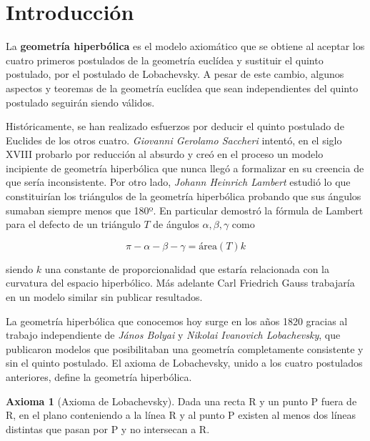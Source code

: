 \documentclass{article}
\theoremstyle{plain}
\theoremstyle{definition}
\newtheorem*{axiom}{Axioma}
\theoremstyle{remark}
\begin{document}
\maketitle

\newpage
\tableofcontents
\newpage

\section{Introducción}

La \textbf{geometría hiperbólica} es el modelo axiomático que se
obtiene al aceptar los cuatro primeros postulados de la geometría
euclídea y sustituir el quinto postulado, por el postulado de
Lobachevsky. A pesar de este cambio, algunos aspectos y teoremas
de la geometría euclídea que sean independientes del quinto postulado
seguirán siendo válidos.

Históricamente, se han realizado esfuerzos por deducir el quinto
postulado de Euclides de los otros cuatro. \textit{Giovanni Gerolamo
  Saccheri} intentó, en el siglo XVIII probarlo por reducción al
absurdo y creó en el proceso un modelo incipiente de geometría
hiperbólica que nunca llegó a formalizar en su creencia de que sería
inconsistente. Por otro lado, \textit{Johann Heinrich Lambert} estudió
lo que constituirían los triángulos de la geometría hiperbólica probando
que sus ángulos sumaban siempre menos que 180º. En particular demostró
la fórmula de Lambert para el defecto de un triángulo $T$ de ángulos
$\alpha,\beta,\gamma$ como

\[
  \pi - \alpha- \beta - \gamma = \mathrm{área}(T)k
\]

siendo $k$ una constante de proporcionalidad que estaría relacionada
con la curvatura del espacio hiperbólico. \cite{cedelberg89} Más adelante Carl Friedrich
Gauss trabajaría en un modelo similar sin publicar resultados.

La geometría hiperbólica que conocemos hoy surge en los años 1820
gracias al trabajo independiente de \textit{János Bolyai} y
\textit{Nikolai Ivanovich Lobachevsky}, que publicaron modelos que
posibilitaban una geometría completamente consistente y sin el quinto
postulado. El axioma de Lobachevsky, unido a los cuatro postulados
anteriores, define la geometría hiperbólica.

\begin{axiom}[Axioma de Lobachevsky]
  Dada una recta R y un punto P fuera de R, en el plano conteniendo a
  la línea R y al punto P existen al menos dos líneas distintas que pasan
  por P y no intersecan a R.
\end{axiom}
\end{document}
